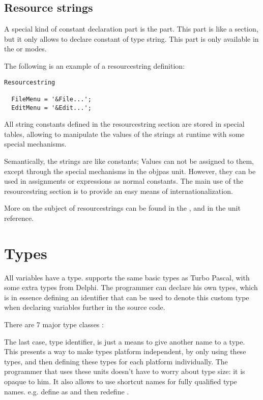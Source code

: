 \section{Resource strings}
\label{se:resourcestring}
A special kind of constant declaration part is the 
part. This part is like a  section, but it only allows
to declare constant of type string. This part is only available in the
 or  modes.

The following is an example of a resourcestring definition:
\begin{verbatim}
Resourcestring

  FileMenu = '&File...';
  EditMenu = '&Edit...';
\end{verbatim}
All string constants defined in the resourcestring section are stored
in special tables, allowing to manipulate the values of the strings
at runtime with some special mechanisms.

Semantically, the strings are like constants; Values can not be assigned  to
them, except through the special mechanisms in the objpas unit. However,
they can be used in assignments or expressions as normal constants.
The main use of the resourcestring section is to provide an easy means
of internationalization.

More on the subject of resourcestrings can be found in the \progref, and
in the  unit reference.

\chapter{Types}
All variables have a type. \fpc supports the same basic types as Turbo
Pascal, with some extra types from Delphi.
The programmer can declare his own types, which is in essence defining an identifier
that can be used to denote this custom type when declaring variables further
in the source code.

There are 7 major type classes :

The last case, {\sffamily type identifier}, is just a means to give another
name to a type. This presents a way to make types platform independent, by
only using these types, and then defining these types for each platform
individually. The programmer that uses these units doesn't have to worry
about type size: it is opaque to him. It also allows to use shortcut names 
for fully qualified type names. e.g. define  as
 and then redefine .

